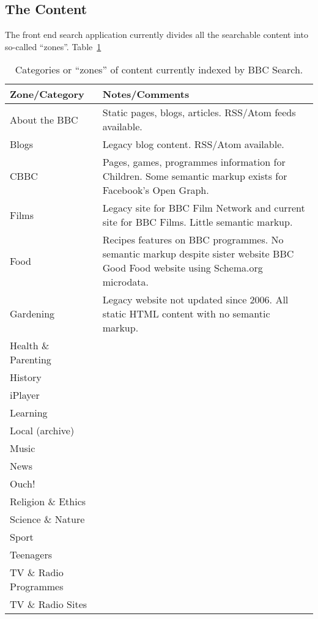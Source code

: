 \subsection{The Content}
\label{content}

The front end search application currently divides all the searchable
content into so-called ``zones''. Table~\ref{zones-table}

\begin{table}[h]
\begin{tabular}{| l | l |}
  Zone/Category          & Notes/Comments \\
  \hline
  About the BBC          &  Static pages, blogs, articles. RSS/Atom feeds available. \\
  Blogs                  &  Legacy blog content. RSS/Atom available. \\
  CBBC                   &  Pages, games, programmes information for Children. Some semantic markup exists for Facebook's Open Graph. \\
  Films                  &  Legacy site for BBC Film Network and current site for BBC Films. Little semantic markup. \\
  Food                   &  Recipes features on BBC programmes. No semantic markup despite sister website BBC Good Food website using Schema.org microdata. \\
  Gardening              &  Legacy website not updated since 2006. All static HTML content with no semantic markup. \\
  Health \& Parenting    &  \\
  History                &  \\
  iPlayer                &  \\
  Learning               &  \\
  Local (archive)        &  \\
  Music                  &  \\
  News                   &  \\
  Ouch!                  &  \\
  Religion \& Ethics     &  \\
  Science \& Nature      &  \\
  Sport                  &  \\
  Teenagers              &  \\
  TV \& Radio Programmes &  \\
  TV \& Radio Sites      &  \\
\end{tabular}
\caption{Categories or ``zones'' of content currently indexed by BBC Search.}
\label{zones-table}
\end{table}

